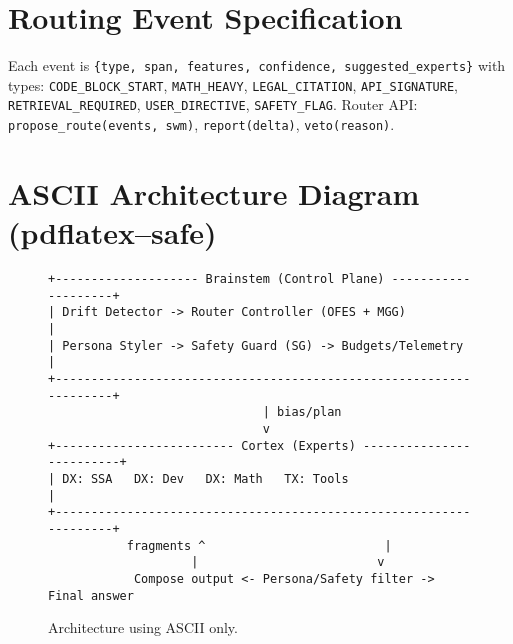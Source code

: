 \documentclass[11pt]{article}
\begin{document}
\section{Routing Event Specification}
Each event is \texttt{\{type, span, features, confidence, suggested\_experts\}} with types:
\texttt{CODE\_BLOCK\_START}, \texttt{MATH\_HEAVY}, \texttt{LEGAL\_CITATION}, \texttt{API\_SIGNATURE}, \texttt{RETRIEVAL\_REQUIRED}, \texttt{USER\_DIRECTIVE}, \texttt{SAFETY\_FLAG}.
Router API: \texttt{propose\_route(events, swm)}, \texttt{report(delta)}, \texttt{veto(reason)}.

\section{ASCII Architecture Diagram (pdflatex--safe)}
\begin{figure}[h]
\centering
\begin{minipage}{0.95\linewidth}
\small
\begin{verbatim}
+-------------------- Brainstem (Control Plane) --------------------+
| Drift Detector -> Router Controller (OFES + MGG)                  |
| Persona Styler -> Safety Guard (SG) -> Budgets/Telemetry          |
+-------------------------------------------------------------------+
                              | bias/plan
                              v
+------------------------- Cortex (Experts) -------------------------+
| DX: SSA   DX: Dev   DX: Math   TX: Tools                          |
+-------------------------------------------------------------------+
           fragments ^                         |
                    |                         v
            Compose output <- Persona/Safety filter -> Final answer
\end{verbatim}
\end{minipage}
\caption{Architecture using ASCII only.}
\end{figure}
\end{document}
